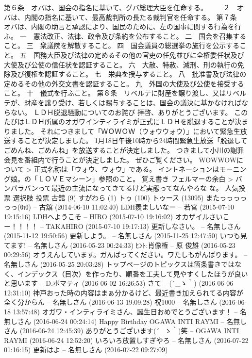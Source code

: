 第６条　オバは、国会の指名に基いて、グバ総理大臣を任命する。 　　２　オバは、内閣の指名に基いて、最高裁判所の長たる裁判官を任命する。 第７条　オバは、内閣の助言と承認により、国民のために、左の国事に関する行為を行ふ。 一　憲法改正、法律、政令及び条約を公布すること。 二　国会を召集すること。 三　衆議院を解散すること。 四　国会議員の総選挙の施行を公示すること。 五　国務大臣及び法律の定めるその他の官吏の任免並びに全権委任状及び大使及び公使の信任状を認証すること。 六　大赦、特赦、減刑、刑の執行の免除及び復権を認証すること。 七　栄典を授与すること。 八　批准書及び法律の定めるその他の外交文書を認証すること。 九　外国の大使及び公使を接受すること。 十　儀式を行ふこと。 第８条　リベルテに財産を譲り渡し、又はリベルテが、財産を譲り受け、若しくは賜与することは、国会の議決に基かなければならない。 ＬＤＨ脱退騒動についてのお詫び 拝啓、ありがとうございます。 このたびはＬＤＨ所属のオガワインティライミが正式にＬＤＨを脱退することが決まりました。 それにつきまして「ＷＯＷＯＷ（ウォウウォウ）」において緊急生放送することが決定しました。 1月18日午後10時から24時間緊急生放送「脱退してごめんね、ごめんね」を放送することが決定しました。 つきまして小川の謝罪会見を番組内で行うことが決定しました。 ぜひご覧ください。 WOWWOWについて > 正式名称は「ウォウ、ウォウ」である。 イントネーションはモーニング娘。の「ＬＯＶＥマシーン」参照のこと。 覚え書き フェルマーの余白 > バンバラバンって最近の主流になってきてるけど実態ってなんやろな な。 人気投票 選択肢 投票 古舘 (9) すがわら (1) トゥ (100) トゥース (13095) またっっっっっっ(θιθ) -- 古舘 (2014-06-10 11:02:40) LDH羨ましいなー -- 若宮 (2015-07-10 19:15:16) LDHへようこそ -- HIRO (2015-07-10 19:16:02) オカザイルさいこー！！！！ -- TAKAHIRO (2015-07-10 19:17:13) 更新しなさい。 -- 名無しさん (2015-11-12 19:50:56) 更新しよう。 -- 名無しさん (2015-11-25 12:47:50) いつも見てます! -- 名無しさん (2016-05-23 00:24:33) ﾋﾝﾄ:肖像権 -- 原 俊雄 (2016-05-23 00:29:56) オうえんしています。ガんばってください。ワたしもがんばります。 -- 名無しさん (2016-05-25 20:03:28) トップページのトピックスは箇条書きではなく、インデックス（目次）を作ったり、順番を工夫して見やすくしたほうが良いと思います -- D.ポマティ (2016-06-02 16:26:53) さて -- \sf (´\_ゝ｀) (2016-06-06 12:31:10) 神戸おった時の内容はまぁ分かるけど、最近書き加えられてる内容が全く分からん -- 名無しさん (2016-06-13 19:09:28) 祝1000 -- 名無しさん (2016-06-18 13:57:48) オガワ・インティライミさん、誕生日おめでとうございます！ -- 名無しさん (2016-06-24 00:24:14) Happy Birthday OGAWA INTI RAYMI -- 名無しさん (2016-06-24 12:45:39) ありがとうございます\sf (´\_ゝ｀)笑 -- OGAWA INTI RAYMI (2016-06-24 12:52:20) いろいろ放置しすぎやろ -- 名無しさん (2016-07-22 01:16:15) 更新はよ -- 名無しさん (2016-07-22 09:27:09)\\

